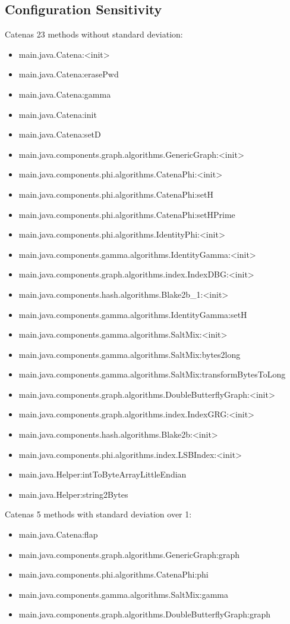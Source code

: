 \subsection{Configuration Sensitivity}
\label{app:conf:sens:catena}
Catenas 23 methods without standard deviation:
\begin{itemize}
\item main.java.Catena:<init>
\item main.java.Catena:erasePwd
\item main.java.Catena:gamma
\item main.java.Catena:init
\item main.java.Catena:setD
\item main.java.components.graph.algorithms.GenericGraph:<init>
\item main.java.components.phi.algorithms.CatenaPhi:<init>
\item main.java.components.phi.algorithms.CatenaPhi:setH
\item main.java.components.phi.algorithms.CatenaPhi:setHPrime
\item main.java.components.phi.algorithms.IdentityPhi:<init>
\item main.java.components.gamma.algorithms.IdentityGamma:<init>
\item main.java.components.graph.algorithms.index.IndexDBG:<init>
\item main.java.components.hash.algorithms.Blake2b\_1:<init>
\item main.java.components.gamma.algorithms.IdentityGamma:setH
\item main.java.components.gamma.algorithms.SaltMix:<init>
\item main.java.components.gamma.algorithms.SaltMix:bytes2long
\item main.java.components.gamma.algorithms.SaltMix:transformBytesToLong
\item main.java.components.graph.algorithms.DoubleButterflyGraph:<init>
\item main.java.components.graph.algorithms.index.IndexGRG:<init>
\item main.java.components.hash.algorithms.Blake2b:<init>
\item main.java.components.phi.algorithms.index.LSBIndex:<init>
\item main.java.Helper:intToByteArrayLittleEndian
\item main.java.Helper:string2Bytes
\end{itemize}

Catenas 5 methods with standard deviation over 1:
\begin{itemize}
\item main.java.Catena:flap
\item main.java.components.graph.algorithms.GenericGraph:graph
\item main.java.components.phi.algorithms.CatenaPhi:phi
\item main.java.components.gamma.algorithms.SaltMix:gamma
\item main.java.components.graph.algorithms.DoubleButterflyGraph:graph
\end{itemize}


